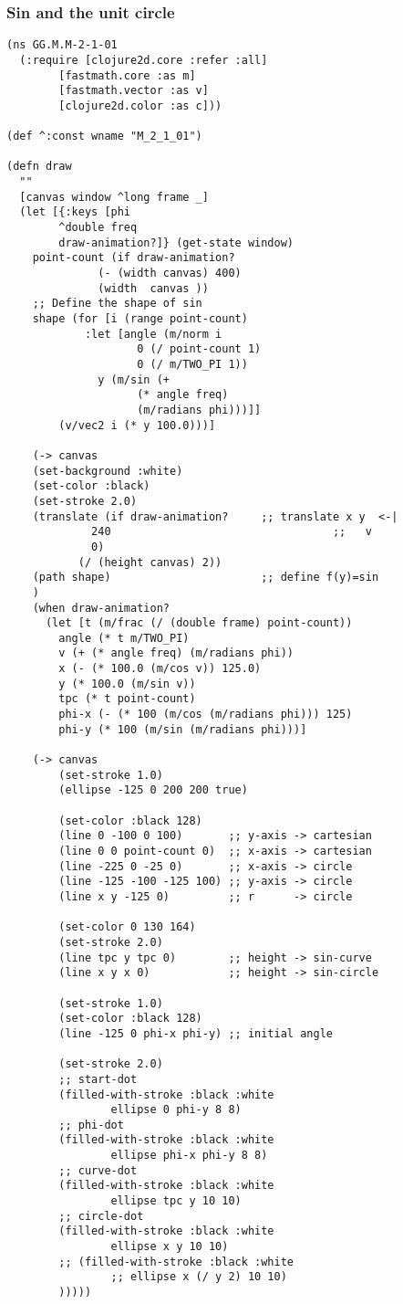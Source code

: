 \documentclass[11pt]{article}
\begin{document}
\subsubsection{Sin and the unit circle}
\label{sec:org0ba7109}
\begin{verbatim}
(ns GG.M.M-2-1-01
  (:require [clojure2d.core :refer :all]
	    [fastmath.core :as m]
	    [fastmath.vector :as v]
	    [clojure2d.color :as c]))

(def ^:const wname "M_2_1_01")

(defn draw
  ""
  [canvas window ^long frame _]
  (let [{:keys [phi
		^double freq
		draw-animation?]} (get-state window)
	point-count (if draw-animation?
		      (- (width canvas) 400)
		      (width  canvas ))
	;; Define the shape of sin
	shape (for [i (range point-count)
		    :let [angle (m/norm i
					0 (/ point-count 1)
					0 (/ m/TWO_PI 1))
			  y (m/sin (+ 
				    (* angle freq)
				    (m/radians phi)))]]
		(v/vec2 i (* y 100.0)))]

    (-> canvas
	(set-background :white)
	(set-color :black)
	(set-stroke 2.0)
	(translate (if draw-animation?     ;; translate x y  <-|
		     240                                  ;;   v
		     0)
		   (/ (height canvas) 2))  
	(path shape)                       ;; define f(y)=sin
	)
    (when draw-animation?
      (let [t (m/frac (/ (double frame) point-count))
	    angle (* t m/TWO_PI)
	    v (+ (* angle freq) (m/radians phi))
	    x (- (* 100.0 (m/cos v)) 125.0)
	    y (* 100.0 (m/sin v))
	    tpc (* t point-count)
	    phi-x (- (* 100 (m/cos (m/radians phi))) 125)
	    phi-y (* 100 (m/sin (m/radians phi)))]

	(-> canvas
	    (set-stroke 1.0)
	    (ellipse -125 0 200 200 true)

	    (set-color :black 128)
	    (line 0 -100 0 100)       ;; y-axis -> cartesian
	    (line 0 0 point-count 0)  ;; x-axis -> cartesian
	    (line -225 0 -25 0)       ;; x-axis -> circle 
	    (line -125 -100 -125 100) ;; y-axis -> circle
	    (line x y -125 0)         ;; r      -> circle

	    (set-color 0 130 164)
	    (set-stroke 2.0)
	    (line tpc y tpc 0)        ;; height -> sin-curve
	    (line x y x 0)            ;; height -> sin-circle

	    (set-stroke 1.0)
	    (set-color :black 128)
	    (line -125 0 phi-x phi-y) ;; initial angle

	    (set-stroke 2.0)
	    ;; start-dot
	    (filled-with-stroke :black :white
				ellipse 0 phi-y 8 8)
	    ;; phi-dot
	    (filled-with-stroke :black :white
				ellipse phi-x phi-y 8 8)
	    ;; curve-dot 
	    (filled-with-stroke :black :white
				ellipse tpc y 10 10)
	    ;; circle-dot
	    (filled-with-stroke :black :white
				ellipse x y 10 10)
	    ;; (filled-with-stroke :black :white
				;; ellipse x (/ y 2) 10 10)
	    )))))



\end{verbatim}
\end{document}
